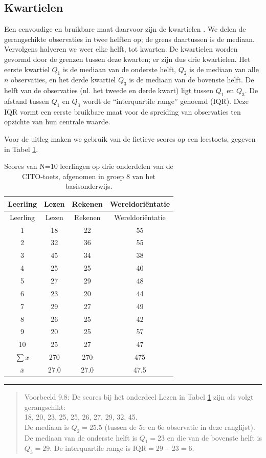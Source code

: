 \documentclass[
]{book}
\begin{document}
\hypertarget{kwartielen}{%
\subsection{Kwartielen}\label{kwartielen}}

Een eenvoudige en bruikbare maat daarvoor zijn de kwartielen \citep{Tukey77}.
We delen de gerangschikte observaties in twee helften op; de grens
daartussen is de mediaan. Vervolgens halveren we weer elke helft, tot
kwarten. De kwartielen worden gevormd door de grenzen tussen deze
kwarten; er zijn dus drie kwartielen. Het eerste kwartiel \(Q_1\) is de
mediaan van de onderste helft, \(Q_2\) is de mediaan van alle \(n\)
observaties, en het derde kwartiel \(Q_3\) is de mediaan van de bovenste
helft. De helft van de observaties (nl. het tweede en derde kwart) ligt
tussen \(Q_1\) en \(Q_3\). De afstand tussen \(Q_1\) en \(Q_3\) wordt de
``interquartile range'' genoemd (IQR). Deze IQR vormt een eerste bruikbare
maat voor de spreiding van observaties ten opzichte van hun centrale
waarde.

Voor de uitleg maken we gebruik van de fictieve scores op een leestoets,
gegeven in Tabel \ref{tab:cito}.

\begin{longtable}[]{@{}cccc@{}}
\caption{\label{tab:cito} Scores van N=10 leerlingen op drie onderdelen van de CITO-toets,
afgenomen in groep 8 van het basisonderwijs.}\tabularnewline
\toprule
Leerling & Lezen & Rekenen & Wereldoriëntatie\tabularnewline
\midrule
\endfirsthead
\toprule
Leerling & Lezen & Rekenen & Wereldoriëntatie\tabularnewline
\midrule
\endhead
1 & 18 & 22 & 55\tabularnewline
2 & 32 & 36 & 55\tabularnewline
3 & 45 & 34 & 38\tabularnewline
4 & 25 & 25 & 40\tabularnewline
5 & 27 & 29 & 48\tabularnewline
6 & 23 & 20 & 44\tabularnewline
7 & 29 & 27 & 49\tabularnewline
8 & 26 & 25 & 42\tabularnewline
9 & 20 & 25 & 57\tabularnewline
10 & 25 & 27 & 47\tabularnewline
\(\sum x\) & 270 & 270 & 475\tabularnewline
\(\overline{x}\) & 27.0 & 27.0 & 47.5\tabularnewline
\bottomrule
\end{longtable}

\begin{center}\rule{0.5\linewidth}{0.5pt}\end{center}

\begin{quote}
Voorbeeld 9.8:
De scores bij het onderdeel Lezen in
Tabel \ref{tab:cito} zijn
als volgt gerangschikt:\\
18, 20, 23, 25, 25, 26, 27, 29, 32, 45.\\
De mediaan is \(Q_2=25.5\) (tussen de 5e en 6e observatie in deze
ranglijst). De mediaan van de onderste helft is \(Q_1=23\) en die van de
bovenste helft is \(Q_3=29\). De interquartile range is
\(\textrm{IQR}=29-23=6\).
\end{quote}
\end{document}
